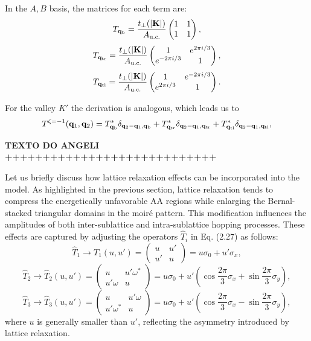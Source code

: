 In the \( A, B \) basis, the matrices for each term are:
\begin{equation} \label{eq:T-qb}
T_{{\vb{q}}_\text{b}} = \frac{t_\perp(\abs{{\vb{K}}})}{A_{\text{u.c.}}}
\begin{pmatrix}
1 & 1 \\
1 & 1
\end{pmatrix},
\end{equation}
\begin{equation} \label{eq:T-qtr}
T_{{\vb{q}}_\text{tr}} = \frac{t_\perp(\abs{{\vb{K}}})}{A_{\text{u.c.}}}
\begin{pmatrix}
1 & e^{2\pi i/3} \\
e^{-2\pi i/3} & 1
\end{pmatrix},
\end{equation}
\begin{equation} \label{eq:T-qtl}
T_{{\vb{q}}_\text{tl}} = \frac{t_\perp(\abs{{\vb{K}}})}{A_{\text{u.c.}}}
\begin{pmatrix}
1 & e^{-2\pi i/3} \\
e^{2\pi i/3} & 1
\end{pmatrix}.
\end{equation}

For the valley $K'$ the derivation is analogous, which leads us to
\begin{equation} \label{eq:interlayer-3terms_valley-1}
T^{\zeta=-1}({\vb{q}}_1, {\vb{q}}_2) = T_{{\vb{q}}_\text{b}}^* \delta_{{\vb{q}}_2 - {\vb{q}}_1, {\vb{q}}_\text{b}}
+ T_{{\vb{q}}_\text{tr}}^* \delta_{{\vb{q}}_2 - {\vb{q}}_1, {\vb{q}}_\text{tr}}
+ T_{{\vb{q}}_\text{tl}}^* \delta_{{\vb{q}}_2 - {\vb{q}}_1, {\vb{q}}_\text{tl}},
\end{equation}

\textbf{TEXTO DO ANGELI ++++++++++++++++++++++++++++}

Let us briefly discuss how lattice relaxation effects can be incorporated into the model. As highlighted in the previous section, lattice relaxation tends to compress the energetically unfavorable AA regions while enlarging the Bernal-stacked triangular domains in the moiré pattern. This modification influences the amplitudes of both inter-sublattice and intra-sublattice hopping processes. These effects are captured by adjusting the operators \( \hat{T}_i \) in Eq. (2.27) as follows:
\[
\hat{T}_1 \to T_1(u, u') =
\begin{pmatrix}
u & u' \\
u' & u
\end{pmatrix}
= u \sigma_0 + u' \sigma_x,
\]
\[
\hat{T}_2 \to \hat{T}_2(u, u') =
\begin{pmatrix}
u & u' \omega^* \\
u' \omega & u
\end{pmatrix}
= u \sigma_0 + u'
\left(
\cos \frac{2\pi}{3} \sigma_x + \sin \frac{2\pi}{3} \sigma_y
\right),
\]
\[
\hat{T}_3 \to \hat{T}_3(u, u') =
\begin{pmatrix}
u & u' \omega \\
u' \omega^* & u
\end{pmatrix}
= u \sigma_0 + u'
\left(
\cos \frac{2\pi}{3} \sigma_x - \sin \frac{2\pi}{3} \sigma_y
\right),
\]
where \( u \) is generally smaller than \( u' \), reflecting the asymmetry introduced by lattice relaxation.


